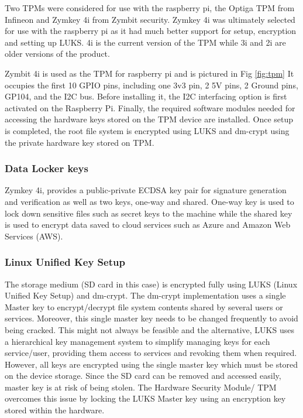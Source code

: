 \documentclass[11pt,openright]{report}
\begin{document}
Two TPMs were considered for use with the raspberry pi, the Optiga TPM from Infineon and Zymkey 4i from Zymbit security. Zymkey 4i was ultimately selected for use with the raspberry pi as it had much better support for setup, encryption and setting up LUKS. 4i is the current version of the TPM while 3i and 2i are older versions of the product.

Zymbit 4i is used as the TPM for raspberry pi and is pictured in Fig \ref{fig:tpm}  It occupies the first 10 GPIO pins, including one 3v3 pin, 2 5V pins, 2 Ground pins, GP104, and the I2C bus. Before installing it, the I2C interfacing option is first activated on the Raspberry Pi. Finally, the required software modules needed for accessing the hardware keys stored on the TPM device are installed. Once setup is completed, the root file system is encrypted using LUKS and dm-crypt using the private hardware key stored on TPM.

\subsubsection{Data Locker keys}
Zymkey 4i, provides a public-private ECDSA key pair for signature generation and verification as well as two keys, one-way and shared. One-way key is used to lock down sensitive files such as secret keys to the machine while the shared key is used to encrypt data saved to cloud services such as Azure and Amazon Web Services (AWS). 

\subsubsection{Linux Unified Key Setup}
The storage medium (SD card in this case) is encrypted fully using LUKS \cite{cryptoeprint:2016:274} (Linux Unified Key Setup) and dm-crypt. The dm-crypt implementation uses a single Master key to encrypt/decrypt file system contents shared by several users or services. Moreover, this single master key needs to be changed frequently to avoid being cracked. This might not always be feasible and the alternative, LUKS uses a hierarchical key management system to simplify managing keys for each service/user, providing them access to services and revoking them when required. However, all keys are encrypted using the single master key which must be stored on the device storage. Since the SD card can be removed and accessed easily, master key is at risk of being stolen. The Hardware Security Module/ TPM overcomes this issue by locking the LUKS Master key using an encryption key stored within the hardware.
\end{document}
